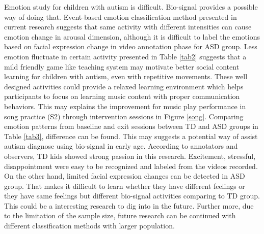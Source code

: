 Emotion study for children with autism is difficult. Bio-signal provides a possible way of 
doing that. Event-based emotion classification method presented in current research suggests
that same activity with different intensities can cause emotion change in arousal dimension,
although it is difficult to label the emotions based on facial expression change in video
annotation phase for ASD group. Less emotion fluctuate in certain activity presented in Table \ref{tab2} suggests that a mild 
friendly game like teaching system may motivate better social content learning for children with autism, 
even with repetitive movements. These well designed activities could provide a relaxed learning 
environment which helps participants to focus on learning music content with proper communication behaviors. 
This may explains the improvement for music play performance in song practice (S2) through intervention 
sessions in Figure \ref{song}. Comparing emotion patterns from baseline and exit sessions between TD and ASD groups in Table \ref{tab3}, 
difference can be found. This may suggests a potential way of assist autism diagnose using bio-signal 
in early age. According to annotators and observers, TD kids showed strong passion
in this research. Excitement, stressful, disappointment were easy to be recognized and labeled from
the videos recorded. On the other hand, limited facial expression changes can be detected in
ASD group. That makes it difficult to learn whether they have different feelings or they have
same feelings but different bio-signal activities comparing to TD group. This could be a interesting research to
dig into in the future. Further more, due to the limitation of the sample size, future research can be 
continued with different classification methods with larger population.\\